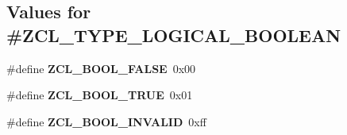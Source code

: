 \subsection*{Values for \#Z\+C\+L\+\_\+\+T\+Y\+P\+E\+\_\+\+L\+O\+G\+I\+C\+A\+L\+\_\+\+B\+O\+O\+L\+E\+AN}
\begin{DoxyCompactItemize}
\item 
\mbox{\label{group__zcl__types_ga415c6e6b5f1ee8afa117a28e9dbbaf91}} 
\#define {\bfseries Z\+C\+L\+\_\+\+B\+O\+O\+L\+\_\+\+F\+A\+L\+SE}~0x00
\item 
\mbox{\label{group__zcl__types_ga10619c77a809e680384955e6173e3512}} 
\#define {\bfseries Z\+C\+L\+\_\+\+B\+O\+O\+L\+\_\+\+T\+R\+UE}~0x01
\item 
\mbox{\label{group__zcl__types_gaa605ed8ffc1519c222f5cf380967dd54}} 
\#define {\bfseries Z\+C\+L\+\_\+\+B\+O\+O\+L\+\_\+\+I\+N\+V\+A\+L\+ID}~0xff
\end{DoxyCompactItemize}
